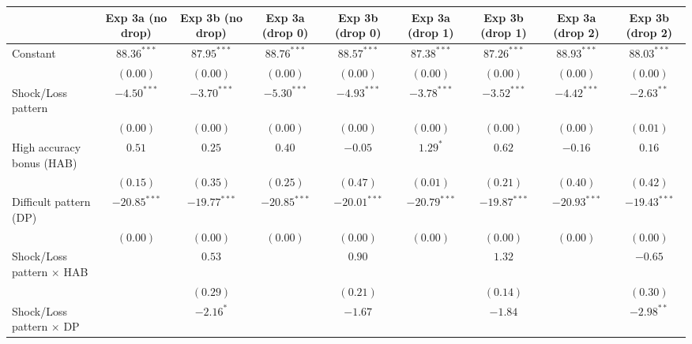 
\begin{table}
\begin{center}
\begin{tabular}{l c c c c c c c c}
\hline
 & Exp 3a (no drop) & Exp 3b (no drop) & Exp 3a (drop 0) & Exp 3b (drop 0) & Exp 3a (drop 1) & Exp 3b (drop 1) & Exp 3a (drop 2) & Exp 3b (drop 2) \\
\hline
Constant                        & $88.36^{***}$  & $87.95^{***}$  & $88.76^{***}$  & $88.57^{***}$  & $87.38^{***}$  & $87.26^{***}$  & $88.93^{***}$  & $88.03^{***}$  \\
                                & $(0.00)$       & $(0.00)$       & $(0.00)$       & $(0.00)$       & $(0.00)$       & $(0.00)$       & $(0.00)$       & $(0.00)$       \\
Shock/Loss pattern              & $-4.50^{***}$  & $-3.70^{***}$  & $-5.30^{***}$  & $-4.93^{***}$  & $-3.78^{***}$  & $-3.52^{***}$  & $-4.42^{***}$  & $-2.63^{**}$   \\
                                & $(0.00)$       & $(0.00)$       & $(0.00)$       & $(0.00)$       & $(0.00)$       & $(0.00)$       & $(0.00)$       & $(0.01)$       \\
High accuracy bonus (HAB)       & $0.51$         & $0.25$         & $0.40$         & $-0.05$        & $1.29^{*}$     & $0.62$         & $-0.16$        & $0.16$         \\
                                & $(0.15)$       & $(0.35)$       & $(0.25)$       & $(0.47)$       & $(0.01)$       & $(0.21)$       & $(0.40)$       & $(0.42)$       \\
Difficult pattern (DP)          & $-20.85^{***}$ & $-19.77^{***}$ & $-20.85^{***}$ & $-20.01^{***}$ & $-20.79^{***}$ & $-19.87^{***}$ & $-20.93^{***}$ & $-19.43^{***}$ \\
                                & $(0.00)$       & $(0.00)$       & $(0.00)$       & $(0.00)$       & $(0.00)$       & $(0.00)$       & $(0.00)$       & $(0.00)$       \\
Shock/Loss pattern $\times$ HAB &                & $0.53$         &                & $0.90$         &                & $1.32$         &                & $-0.65$        \\
                                &                & $(0.29)$       &                & $(0.21)$       &                & $(0.14)$       &                & $(0.30)$       \\
Shock/Loss pattern $\times$ DP  &                & $-2.16^{*}$    &                & $-1.67$        &                & $-1.84$        &                & $-2.98^{**}$   \\

\end{tabular}
\end{center}
\end{table}
